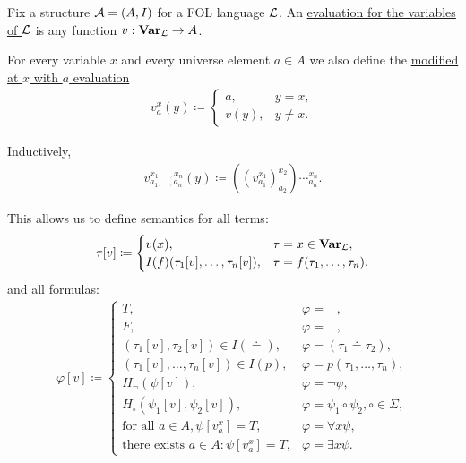 \begin{definition}\label{def:first_order_evaluation}
  Fix a structure $\mathcal A = (A, I)$ for a FOL language $\mathcal L$. An \ul{evaluation for the variables of $\mathcal L$} is any function $v: \operatorname{\mathbf{Var}}_{\mathcal L} \to A$.

  For every variable $x$ and every universe element $a \in A$ we also define the \ul{modified at $x$ with $a$ evaluation}
  \begin{align*}
    v_a^x(y) \coloneqq \begin{cases}
      a,    &y = x, \\
      v(y), &y \neq x.
    \end{cases}
  \end{align*}

  Inductively,
  \begin{align*}
    v_{a_1, \ldots, a_n}^{x_1, \ldots, x_n}(y) \coloneqq ((v_{a_1}^{x_1})_{a_2}^{x_2})\cdots_{a_n}^{x_n}.
  \end{align*}

  This allows us to define semantics for all terms:
  \begin{align*}
    \tau[v] \coloneqq \begin{cases}
      v(x),                               &\tau = x \in \operatorname{\mathbf{Var}}_{\mathcal L}, \\
      I(f)(\tau_1[v], \ldots, \tau_n[v]), &\tau = f(\tau_1, \ldots, \tau_n).
    \end{cases}
  \end{align*}
  and all formulas:
  \begin{align*}
    \varphi[v] \coloneqq \begin{cases}
      T,                                                &\varphi = \top, \\
      F,                                                &\varphi = \bot, \\
      (\tau_1[v], \tau_2[v]) \in I(\doteq),             &\varphi = (\tau_1 \doteq \tau_2), \\
      (\tau_1[v], \ldots, \tau_n[v]) \in I(p),          &\varphi = p(\tau_1, \ldots, \tau_n), \\
      H_\neg(\psi[v]),                                  &\varphi = \neg \psi, \\
      H_\circ(\psi_1[v], \psi_2[v]),                    &\varphi = \psi_1 \circ \psi_2, \circ \in \Sigma, \\
      \text{for all } a \in A, \psi[v_a^x] = T,         &\varphi = \forall x \psi, \\
      \text{there exists } a \in A: \psi[v_a^x] = T,    &\varphi = \exists x \psi.
    \end{cases}
  \end{align*}


\end{definition}

